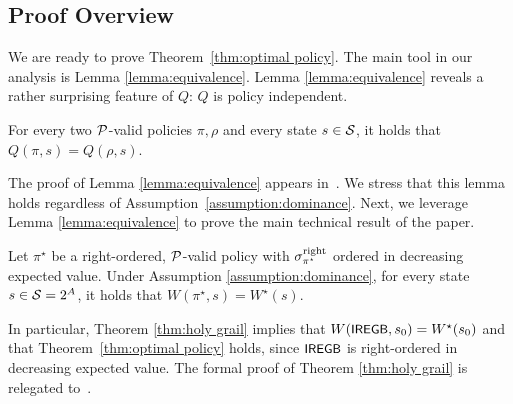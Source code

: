 \subsection{Proof Overview}\label{subsec:results}
We are ready to prove Theorem~\ref{thm:optimal policy}. The main tool in our analysis is Lemma \ref{lemma:equivalence}. Lemma \ref{lemma:equivalence} reveals a rather surprising feature of $Q$: $Q$ is policy independent. 
\begin{lemma}\label{lemma:equivalence}
For every two $\mathcal{P}$-valid policies $\pi,\rho$ and every state $s\in \mathcal{S}$, it holds that $Q(\pi,s)=Q(\rho,s)$.
\end{lemma}
The proof of Lemma \ref{lemma:equivalence} appears in~{\ifnum{}\fi}. We stress that this lemma holds regardless of Assumption~\ref{assumption:dominance}. Next, we leverage Lemma \ref{lemma:equivalence} to prove the main technical result of the paper.
\begin{theorem}
\label{thm:holy grail}
Let $\pi^\star$ be a right-ordered, $\mathcal{P}$-valid policy with $\sigma^{\textnormal{right}}_{\pi^\star}$ ordered in decreasing expected value. Under Assumption \ref{assumption:dominance}, for every state $s\in \mathcal{S}=2^A$, it holds that $W(\pi^\star,s)=W^\star(s)$.
\end{theorem}
In particular, Theorem \ref{thm:holy grail} implies that $W({\small\textnormal{\textsf{IREGB}}},s_0)=W^\star(s_0)$ and that Theorem~\ref{thm:optimal policy} holds,  since ${\small\textnormal{\textsf{IREGB}}}$ is right-ordered in decreasing expected value. The formal proof of Theorem \ref{thm:holy grail} is relegated to~{\ifnum{}\fi}. 